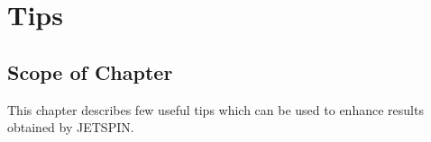 \documentclass[oneside,english]{book}
\begin{document}





































\newpage{}

\chapter{Tips}

\section*{Scope of Chapter}

This chapter describes few useful tips which can be used to enhance
results obtained by JETSPIN.



\newpage{}

 


\newpage{} 
\end{document}
